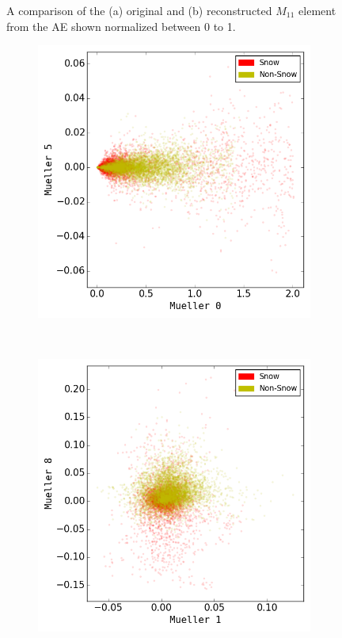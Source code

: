 \begin{figure}
\begin{subfigure}[b]{0.45\textwidth}
\caption{}
\end{subfigure}
\caption{A comparison of the (a) original and (b) reconstructed $M_{11}$ element from the AE shown normalized between 0 to 1. }
\label{fig:ae_re}
\end{figure}

\begin{figure}
\centering
\begin{subfigure}[b]{0.45\textwidth}
\includegraphics[width=\textwidth]{Figures/SnowCover2018/Mueller/0_5}
\caption{}
\end{subfigure}
~
\begin{subfigure}[b]{0.45\textwidth}
\includegraphics[width=\textwidth]{Figures/SnowCover2018/Mueller/1_8}

\end{subfigure}
\end{figure}
